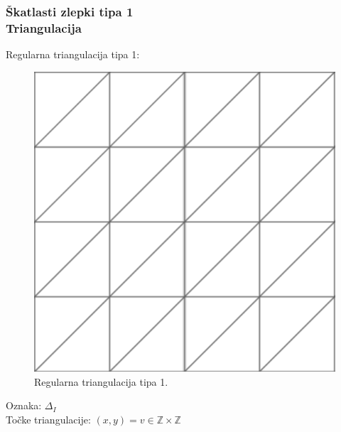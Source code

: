 \documentclass{beamer}
\begin{document}
\begin{frame}

\frametitle{Škatlasti zlepki tipa 1 \\ Triangulacija}

Regularna triangulacija tipa 1: 

\begin{figure}
    \centering
    \includegraphics[scale=0.23]{triangulacija1}
    \caption{Regularna triangulacija tipa 1.}
\end{figure}


Oznaka: $\Delta_I$ \\
Točke triangulacije: $(x,y) = v \in \mathbb{Z} \times \mathbb{Z}$


\end{frame}

\end{document}
